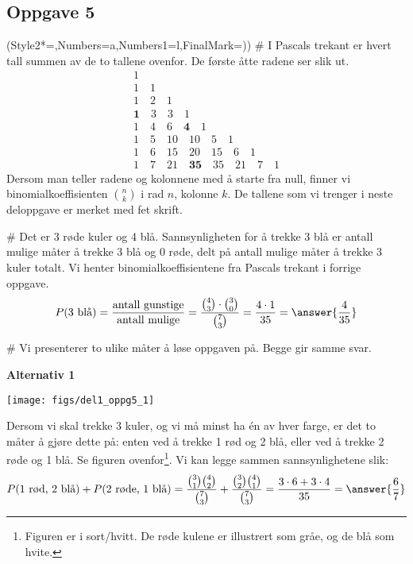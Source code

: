 \subsection*{Oppgave 5}
\begin{easylist}[enumerate]
	\ListProperties(Style2*=,Numbers=a,Numbers1=l,FinalMark={)})
	# I Pascals trekant er hvert tall summen av de to tallene ovenfor.
	De første åtte radene ser slik ut.
	\begin{gather*}
	1 \\
	1 \quad 1 \\
	1 \quad 2 \quad 1 \\
	\textbf{1} \quad 3 \quad 3 \quad 1 \\
	1 \quad 4 \quad 6 \quad \textbf{4} \quad 1  \\
	1 \quad 5 \quad 10 \quad 10 \quad 5 \quad 1  \\
	1 \quad 6 \quad 15 \quad 20 \quad 15 \quad 6 \quad 1 \\
	1 \quad 7 \quad 21 \quad \textbf{35} \quad 35 \quad 21 \quad 7 \quad 1 
	\end{gather*}
	Dersom man teller radene og kolonnene med å starte fra null, finner vi binomialkoeffisienten $\binom{n}{k}$ i rad $n$, kolonne $k$.
	De tallene som vi trenger i neste deloppgave er merket med fet skrift.
	
	# Det er 3 røde kuler og 4 blå. Sannsynligheten for å trekke 3 blå er antall mulige måter å trekke 3 blå og 0 røde, delt på antall mulige måter å trekke 3 kuler totalt.
	Vi henter binomialkoeffisientene fra Pascals trekant i forrige oppgave.
	\begin{equation*}
		P(3\text{ blå}) = \frac{\text{antall gunstige}}{\text{antall mulige}}
		= \frac{\binom{4}{3} \cdot \binom{3}{0}}{\binom{7}{3}} = 
		\frac{4 \cdot 1}{35} = \answer{\frac{4}{35}}
	\end{equation*}
	
	# Vi presenterer to ulike måter å løse oppgaven på. Begge gir samme svar.
	
	\textbf{Alternativ 1}
	\begin{center}
		\texttt{[image: figs/del1\_oppg5\_1]}
	\end{center}
	Dersom vi skal trekke 3 kuler, og vi må minst ha én av hver farge, er det to måter å gjøre dette på: enten ved å trekke 1 rød og 2 blå, eller ved å trekke 2 røde og 1 blå. Se figuren ovenfor\footnote{Figuren er i sort/hvitt. De røde kulene er illustrert som gråe, og de blå som hvite.}. Vi kan legge sammen sannsynlighetene slik:
	\begin{equation*}
		P(\text{1 rød, 2 blå}) + P(\text{2 røde, 1 blå}) = \frac{\binom{3}{1}\binom{4}{2}}{\binom{7}{3}}
		+
		\frac{\binom{3}{2}\binom{4}{1}}{\binom{7}{3}} = \frac{3 \cdot 6 + 3 \cdot 4}{35}  = \answer{\frac{6}{7}}
	\end{equation*}
	

\end{easylist}
